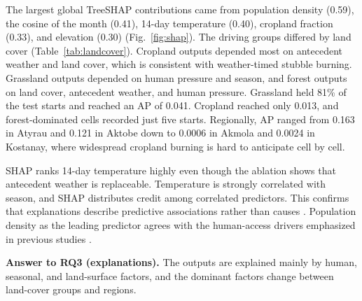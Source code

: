 \documentclass[pdflatex,sn-mathphys-num]{sn-jnl}
\begin{document}
The largest global TreeSHAP contributions came from population density (0.59), the cosine of the month (0.41), 14-day temperature (0.40), cropland fraction (0.33), and elevation (0.30) (Fig.~\ref{fig:shap}). The driving groups differed by land cover (Table~\ref{tab:landcover}). Cropland outputs depended most on antecedent weather and land cover, which is consistent with weather-timed stubble burning. Grassland outputs depended on human pressure and season, and forest outputs on land cover, antecedent weather, and human pressure. Grassland held 81\% of the test starts and reached an AP of 0.041. Cropland reached only 0.013, and forest-dominated cells recorded just five starts. Regionally, AP ranged from 0.163 in Atyrau and 0.121 in Aktobe down to 0.0006 in Akmola and 0.0024 in Kostanay, where widespread cropland burning is hard to anticipate cell by cell.

SHAP ranks 14-day temperature highly even though the ablation shows that antecedent weather is replaceable. Temperature is strongly correlated with season, and SHAP distributes credit among correlated predictors. This confirms that explanations describe predictive associations rather than causes \cite{iban2024shap,ouazri2026catboost}. Population density as the leading predictor agrees with the human-access drivers emphasized in previous studies \cite{iban2024shap,bouzeraa2025wsm}.

\textbf{Answer to RQ3 (explanations).} The outputs are explained mainly by human, seasonal, and land-surface factors, and the dominant factors change between land-cover groups and regions.
\end{document}
